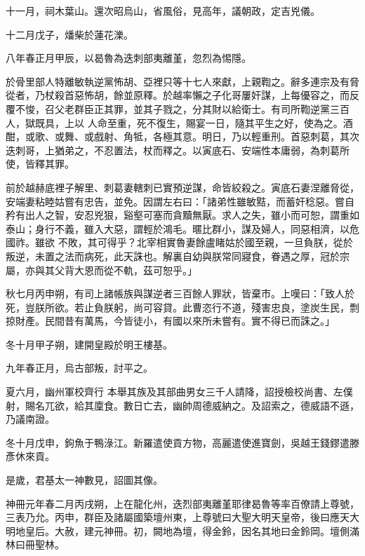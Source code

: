 \begin{pinyinscope}
 十一月，祠木葉山。還次昭烏山，省風俗，見高年，議朝政，定吉兇儀。



 十二月戊子，燔柴於蓮花濼。



 八年春正月甲辰，以曷魯為迭刺部夷離堇，忽烈為惕隱。



 於骨里部人特離敏執逆黨怖胡、亞裡只等十七人來獻，上親鞫之。辭多連宗及有脅從者，乃杖殺首惡怖胡，餘並原釋。於越率懶之子化哥屢奸謀，上每優容之，而反覆不悛，召父老群臣正其罪，並其子戮之，分其財以給衛士。有司所鞫逆黨三百人，獄既具，上以
 人命至重，死不復生，賜宴一日，隨其平生之好，使為之。酒酣，或歌、或舞、或戲射、角牴，各極其意。明日，乃以輕重刑。首惡刺葛，其次迭刺哥，上猶弟之，不忍置法，杖而釋之。以寅底石、安端性本庸弱，為刺葛所使，皆釋其罪。



 前於越赫底裡子解里、刺葛妻轄刺已實預逆謀，命皆絞殺之。寅底石妻涅離脅從，安端妻粘睦姑嘗有忠告，並免。因謂左右曰：「諸弟性雖敏黠，而蓄奸稔惡。嘗自矜有出人之智，安忍兇狠，谿壑可塞而貪黷無厭。求人之失，雖小而可恕，謂重如泰山；身行不義，雖入大惡，謂輕於鴻毛。暱比群小，謀及婦人，同惡相濟，以危國祚。雖欲
 不敗，其可得乎？北宰相實魯妻餘盧睹姑於國至親，一旦負朕，從於叛逆，未置之法而病死，此天誅也。解裏自幼與朕常同寢食，眷遇之厚，冠於宗屬，亦與其父背大恩而從不軌，茲可恕乎。」



 秋七月丙申朔，有司上諸帳族與謀逆者三百餘人罪狀，皆棄市。上嘆曰：「致人於死，豈朕所欲。若止負朕躬，尚可容貸。此曹恣行不道，殘害忠良，塗炭生民，剽掠財產。民間昔有萬馬，今皆徒小，有國以來所未嘗有。實不得已而誅之。」



 冬十月甲子朔，建開皇殿於明王樓基。



 九年春正月，烏古部叛，討平之。



 夏六月，幽州軍校齊行
 本舉其族及其部曲男女三千人請降，詔授檢校尚書、左僕射，賜名兀欲，給其廩食。數日亡去，幽帥周德威納之。及詔索之，德威語不遜，乃議南證。



 冬十月戊申，鉤魚于鴨淥江。新羅遣使貢方物，高麗遣使進寶劍，吳越王錢鏐遣滕彥休來貢。



 是歲，君基太一神數見，詔圖其像。



 神冊元年春二月丙戌朔，上在龍化州，迭烈部夷離堇耶律曷魯等率百僚請上尊號，三表乃允。丙申，群臣及諸屬國築壇州東，上尊號曰大聖大明天皇帝，後曰應天大明地皇后。大赦，建元神冊。初，闕地為壇，得金鈴，因名其地曰金鈴岡。壇側滿林曰冊聖林。




\end{pinyinscope}
